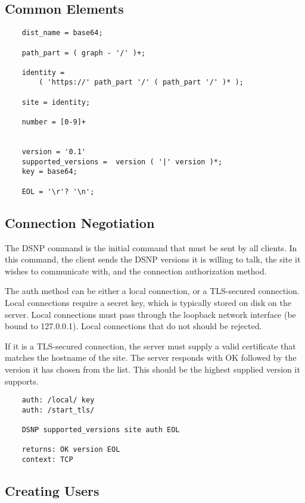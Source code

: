 \documentclass[letterpaper,11pt,oneside]{article}
\begin{document}
\subsection{Common Elements}

\vspace{10pt}
\begin{verbatim}
    dist_name = base64;

    path_part = ( graph - '/' )+;

    identity = 
        ( 'https://' path_part '/' ( path_part '/' )* );

    site = identity;

    number = [0-9]+           


    version = '0.1'
    supported_versions =  version ( '|' version )*;
    key = base64;

    EOL = '\r'? '\n';
\end{verbatim}

\subsection{Connection Negotiation}

The DSNP command is the initial command that must be sent by all clients. In
this command, the client sends the DSNP versions it is willing to talk, the
site it wishes to communicate with, and the connection authorization method.

The auth method can be either a local connection, or a TLS-secured connection.
Local connections require a secret key, which is typically stored on disk on
the server. Local connections must pass through the loopback network interface
(be bound to 127.0.0.1). Local connections that do not should be rejected.

If it is a TLS-secured connection, the server must supply a valid certificate
that matches the hostname of the site. The server responds with OK followed by
the version it has chosen from the list. This should be the highest supplied
version it supports.

\vspace{10pt}
\begin{verbatim}
    auth: /local/ key
    auth: /start_tls/

    DSNP supported_versions site auth EOL

    returns: OK version EOL
    context: TCP
\end{verbatim}

\subsection{Creating Users}
\end{document}
